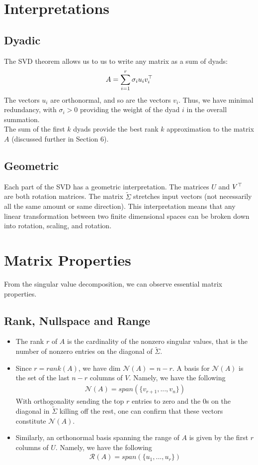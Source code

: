 \documentclass[12pt]{article}
\begin{document}
\section{Interpretations}
\subsection*{Dyadic}
The SVD theorem allows us to us to write any matrix as a sum of dyads:
\begin{gather*}
    A = \sum_{i=1}^r \sigma_i u_iv_i^\top
\end{gather*}
The vectors $u_i$ are orthonormal, and so are the vectors $v_i$. Thus, we have minimal redundancy, with $\sigma_i>0$ providing the weight of the dyad $i$ in the overall summation.\\

\noindent The sum of the first $k$ dyads provide the best rank $k$ approximation to the matrix $A$ (discussed further in Section $6$).
\subsection*{Geometric}
Each part of the SVD has a geometric interpretation. The matrices $U$ and $V^\top$ are both rotation matrices. The matrix $\tilde{\Sigma}$ stretches input vectors (not necessarily all the same amount or same direction). This interpretation means that any linear transformation between two finite dimensional spaces can be broken down into rotation, scaling, and rotation.

\section{Matrix Properties}
From the singular value decomposition, we can observe essential matrix properties.

\subsection*{Rank, Nullspace and Range}
\begin{itemize}
    \item The rank $r$ of $A$ is the cardinality of the nonzero singular values, that is the number of nonzero entries on the diagonal of $\tilde{\Sigma}$.
    \item Since $r=rank(A)$, we have dim $\mathcal{N}(A)=n−r$. A basis for $\mathcal{N}(A)$ is the set of the last $n - r$ columns of $V$. Namely, we have the following
    \begin{gather*}
        \mathcal{N}(A) = span(\lbrace v_{r+1}, ..., v_{n}\rbrace) 
    \end{gather*}
    With orthogonality sending the top $r$ entries to zero and the $0$s on the diagonal in $\tilde{\Sigma}$ killing off the rest, one can confirm that these vectors constitute $\mathcal{N}(A)$.
    \item Similarly, an orthonormal basis spanning the range of $A$ is given by the first $r$ columns of $U$. Namely, we have the following
        \begin{gather*}
        \mathcal{R}(A) = span(\lbrace u_{1}, ..., u_{r}\rbrace) 
    \end{gather*}
\end{itemize}
\end{document}
